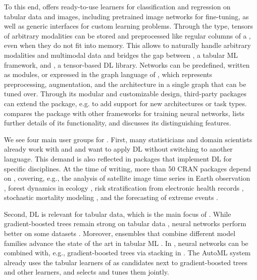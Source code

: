 \documentclass[article,shortnames]{jss}
\theoremstyle{definition}
\begin{document}
To this end, \mlrttorch{} offers ready-to-use learners for classification and regression on tabular data and images, including pretrained image networks for fine-tuning, as well as generic interfaces for custom learning problems.
Through the  type, tensors of arbitrary modalities can be stored and preprocessed like regular columns of a , even when they do not fit into memory.
This allows to naturally handle arbitrary modalities and multimodal data and bridges the gap between \mlrt{}, a tabular ML framework, and \torch{}, a tensor-based DL library.
Networks can be predefined, written as \torch{} modules, or expressed in the graph language of \mlrtpipelines{}, which represents preprocessing, augmentation, and the architecture in a single graph that can be tuned over.
Through its modular and customizable design, third-party packages can extend the package, e.g. to add support for new architectures or task types.
 compares the package with other \rlang{} frameworks for training neural networks,  lists further details of its functionality, and  discusses its distinguishing features.

We see four main user groups for \mlrttorch{}.
First, many statisticians and domain scientists already work with \rlang{} and \mlrt{} and want to apply DL without switching to another language.
This demand is also reflected in \rlang{} packages that implement DL for specific disciplines.
At the time of writing, more than 50 CRAN packages depend on \torch{}, covering, e.g., the analysis of satellite image time series in Earth observation \citep{ref-simoes2021sits}, forest dynamics in ecology \citep{ref-finn}, risk stratification from electronic health records \citep{ref-dicerclust}, stochastic mortality modeling \citep{ref-nnmomo}, and the forecasting of extreme events \citep{ref-eqrn}.

Second, DL is relevant for tabular data, which is the main focus of \mlrt{}.
While gradient-boosted trees remain strong on tabular data \citep{ref-borisov2022deep}, neural networks perform better on some datasets \citep{ref-mcelfresh2024neural}.
Moreover, ensembles that combine different model families advance the state of the art in tabular ML \citep{ref-erickson2025tabarena}.
In \mlrttorch{}, neural networks can be combined with, e.g., gradient-boosted trees via stacking in \mlrtpipelines{}.
The AutoML system  \citep{ref-mlr3automl} already uses the tabular learners of \mlrttorch{} as candidates next to gradient-boosted trees and other learners, and selects and tunes them jointly.
\end{document}
